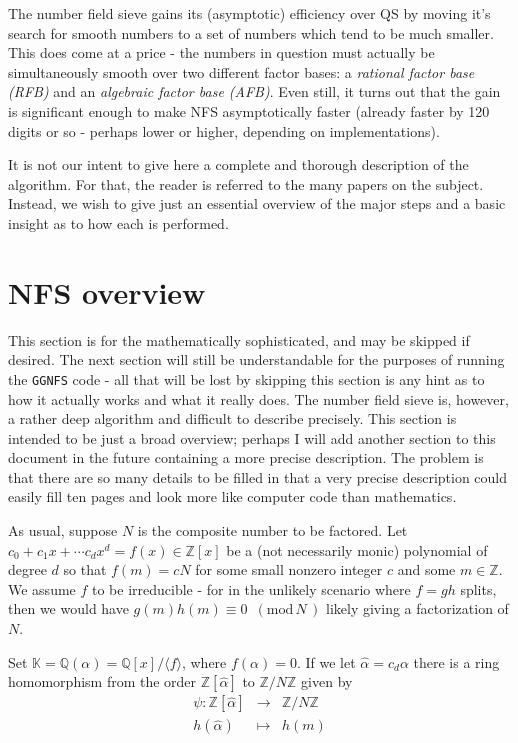 \documentclass[12pt]{article}
\newcommand{\K}{\mathbb{K}}
\newcommand{\Z}{\mathbb{Z}}
\newcommand{\Q}{\mathbb{Q}}
\newcommand{\md}[1]{\,\,\, ( \mathrm{mod}\, #1 \,) }
\newcommand{\ideal}[1]{{\langle #1 \rangle}}
\begin{document}
  The number field sieve gains its (asymptotic) efficiency over QS by
  moving it's search for smooth numbers to a set of numbers which
  tend to be much smaller. This does come at a price - the numbers in
  question must actually be simultaneously smooth over two different factor bases:
  a {\em rational factor base (RFB)} and an {\em algebraic factor base (AFB)}.
  Even still, it turns out that the gain is significant enough to make NFS
  asymptotically faster (already faster by 120 digits or so - perhaps
  lower or higher, depending on implementations).

  It is not our intent to give here a complete and thorough description
  of the algorithm. For that, the reader is referred to the many papers
  on the subject. Instead, we wish to give just an essential overview
  of the major steps and a basic insight as to how each is performed.

\section{NFS overview} \label{sec:nfsoverview}

  This section is for the mathematically sophisticated, and may
  be skipped if desired. The next section will still be understandable
  for the purposes of running the {\tt GGNFS} code - all that will
  be lost by skipping this section is any hint as to how it actually
  works and what it really does. The number field sieve is, however,
  a rather deep algorithm and difficult to describe precisely.
  This section is intended to be just a broad overview; perhaps
  I will add another section to this document in the future
  containing a more precise description. The problem is that
  there are so many details to be filled in that a very precise
  description could easily fill ten pages and look more like
  computer code than mathematics.

  As usual, suppose $N$ is the composite number to be factored.
  Let $c_0+c_1x+\cdots c_dx^d = f(x)\in\Z[x]$ be a 
  (not necessarily monic) polynomial of degree $d$
  so that $f(m)=cN$ for some small nonzero integer $c$ and some
  $m\in\Z$. We assume $f$ to be irreducible - for in the unlikely
  scenario where $f=gh$ splits, then we would have 
  $g(m)h(m)\equiv 0\md{N}$ likely giving a factorization of $N$.

  Set $\K = \Q(\alpha) = \Q[x]/\ideal{f}$, where $f(\alpha)=0$.
  If we let $\hat{\alpha}=c_d\alpha$ there
  is a ring homomorphism from the order $\Z[\hat{\alpha}]$ to $\Z/N\Z$
  given by
  \begin{eqnarray}
    \psi : \Z[\hat{\alpha}] & \longrightarrow & \Z/N\Z \\
           h(\hat{\alpha}) & \longmapsto & h(m)
  \end{eqnarray}
\end{document}
